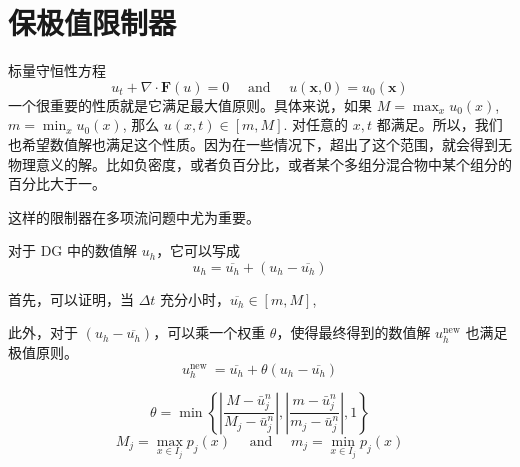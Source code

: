 \documentclass{article}
\numberwithin{equation}{subsection}    %
\begin{document}
\section{保极值限制器}
标量守恒性方程
\begin{equation}
    u_{t}+\nabla \cdot \mathbf{F}(u)=0 \quad \text { and } \quad u(\mathbf{x}, 0)=u_{0}(\mathbf{x})
\end{equation}
一个很重要的性质就是它满足最大值原则。具体来说，如果 $M=\max_x u_0(x)$,$m=\min_x u_0(x)$, 那么 $u(x,t)\in[m,M]$. 对任意的 $x,t$ 都满足。所以，我们也希望数值解也满足这个性质。因为在一些情况下，超出了这个范围，就会得到无物理意义的解。比如负密度，或者负百分比，或者某个多组分混合物中某个组分的百分比大于一。

这样的限制器在多项流问题中尤为重要。

对于 DG 中的数值解 $u_h$，它可以写成
\begin{equation}
    u_{h}=\overline{u_h}+(u_h-\overline{u_h})
\end{equation}

首先，可以证明，当 $\Delta t$ 充分小时，$\overline{u_h}\in[m,M]$,

此外，对于 $(u_h-\overline{u_h})$，可以乘一个权重 $\theta$，使得最终得到的数值解 $u_h^{\text{new}}$ 也满足极值原则。
\begin{equation}
    u_{h}^{\text {new }}=\overline{u_h}+\theta(u_h-\overline{u_h})
\end{equation}

\begin{equation}
    \theta=\min \left\{\left|\frac{M-\bar{u}_{j}^{n}}{M_{j}-\bar{u}_{j}^{n}}\right|,\left|\frac{m-\bar{u}_{j}^{n}}{m_{j}-\bar{u}_{j}^{n}}\right|, 1\right\}
\end{equation}
\begin{equation}
    M_{j}=\max _{x \in I_{j}} p_{j}(x) \quad \text { and } \quad m_{j}=\min _{x \in I_{j}} p_{j}(x)
\end{equation}
\end{document}
